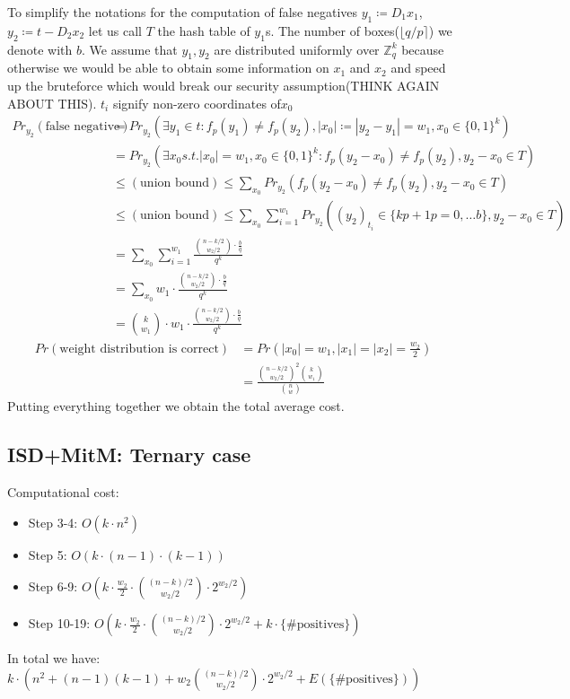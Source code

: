 \documentclass[12pt]{article}
\newcommand{\ZZ}{\mathbb{Z}}
\begin{document}
To simplify the notations for the computation of false negatives $y_1 \coloneqq D_1x_1$, $y_2 \coloneqq t-D_2x_2$ let us call $T$ the hash table of $y_1$s. The number of boxes($\lfloor q/p \rceil$) we denote with $b$. We assume that $y_1, y_2$ are distributed uniformly over $\ZZ_q^{k}$ because otherwise we would be able to obtain some information on $x_1$ and $x_2$ and speed up the bruteforce which would break our security assumption(THINK AGAIN ABOUT THIS). $t_i$ signify non-zero coordinates of$x_0$
\[
\begin{split}
    Pr_{y_2}(\text{false negative}) & = Pr_{y_2}(\exists y_1 \in t: f_p(y_1) \neq f_p(y_2), |x_0| \coloneqq |y_2 - y_1| = w_1, x_0 \in \{0,1\}^{k}) \\
    & = Pr_{y_2}(\exists x_0 s.t. |x_0| = w_1, x_0 \in\{0,1\}^{k}: f_p(y_2 - x_0) \neq f_p(y_2), y_2 - x_0 \in T) \\
    & \leq (\text{union bound}) \leq \sum_{x_0} Pr_{y_2}(f_p(y_2 - x_0) \neq f_p(y_2), y_2 - x_0 \in T) \\
    & \leq (\text{union bound}) \leq \sum_{x_0} \sum_{i = 1}^{w_1} Pr_{y_2}((y_2)_{t_i} \in \{kp+1 p=0, \dots b\}, y_2 - x_0 \in T) \\
    & = \sum_{x_0} \sum_{i = 1}^{w_1} \frac{\binom{n-k/2}{w_2/2} \cdot \frac{b}{q}}{q^k} \\
    & = \sum_{x_0} w_1 \cdot \frac{\binom{n-k/2}{w_2/2} \cdot \frac{b}{q}}{q^k} \\
    & = \binom{k}{w_1} \cdot w_1 \cdot \frac{\binom{n-k/2}{w_2/2} \cdot \frac{b}{q}}{q^k}
\end{split}
\]
\[
\begin{split}
    Pr(\text{weight distribution is correct}) & = Pr(|x_0| = w_1, |x_1| = |x_2| = \frac{w_2}{2}) \\
    & = \frac{\binom{n-k/2}{w_2/2}^{2}\binom{k}{w_1}}{\binom{n}{w}}
\end{split}
\]
Putting everything together we obtain the total average cost.

\subsection{ISD+MitM: Ternary case}

Computational cost:
\begin{itemize}
    \item Step 3-4: $O(k \cdot n^2)$
    \item Step 5: $O(k \cdot (n-1) \cdot (k-1))$
    \item Step 6-9: $O(k \cdot \frac{w_2}{2} \cdot \binom{(n-k)/2}{w_2/2} \cdot 2^{w_2/2})$
    \item Step 10-19: $O(k \cdot \frac{w_2}{2} \cdot \binom{(n-k)/2}{w_2/2} \cdot 2^{w_2/2} + k \cdot \{\text{\# positives}\})$
\end{itemize}
In total we have: $k \cdot (n^2 + (n-1)(k-1) + w_2\binom{(n-k)/2}{w_2/2} \cdot 2^{w_2/2} + E(\{\text{\# positives}\}))$
\end{document}
